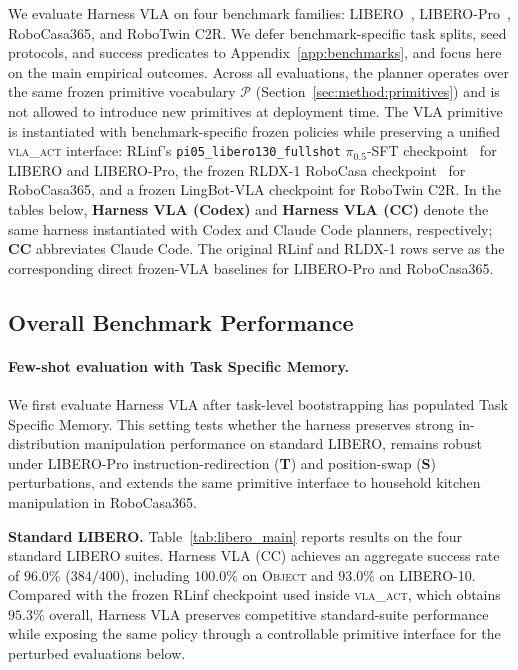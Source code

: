 \documentclass{article}
\begin{document}
We evaluate Harness VLA on four benchmark families: LIBERO~\citep{liu2023libero}, LIBERO-Pro~\citep{Lagrange1788}, RoboCasa365, and RoboTwin C2R. We defer benchmark-specific task splits, seed protocols, and success predicates to Appendix~\ref{app:benchmarks}, and focus here on the main empirical outcomes. Across all evaluations, the planner operates over the same frozen primitive vocabulary $\mathcal{P}$ (Section~\ref{sec:method:primitives}) and is not allowed to introduce new primitives at deployment time. The VLA primitive is instantiated with benchmark-specific frozen policies while preserving a unified \textsc{vla\_act} interface: RLinf's \texttt{pi05\_libero130\_fullshot} $\pi_{0.5}$-SFT checkpoint~\citep{yu2025rlinf} for LIBERO and LIBERO-Pro, the frozen RLDX-1 RoboCasa checkpoint~\citep{kim2026rldx} for RoboCasa365, and a frozen LingBot-VLA checkpoint for RoboTwin C2R. In the tables below, \textbf{Harness VLA (Codex)} and \textbf{Harness VLA (CC)} denote the same harness instantiated with Codex and Claude Code planners, respectively; \textbf{CC} abbreviates Claude Code. The original RLinf and RLDX-1 rows serve as the corresponding direct frozen-VLA baselines for LIBERO-Pro and RoboCasa365.

\subsection{Overall Benchmark Performance}
\label{sec:exp:overall}

\paragraph{Few-shot evaluation with Task Specific Memory.}
We first evaluate Harness VLA after task-level bootstrapping has populated Task Specific Memory. This setting tests whether the harness preserves strong in-distribution manipulation performance on standard LIBERO, remains robust under LIBERO-Pro instruction-redirection (\textbf{T}) and position-swap (\textbf{S}) perturbations, and extends the same primitive interface to household kitchen manipulation in RoboCasa365.

\textbf{Standard LIBERO.} Table~\ref{tab:libero_main} reports results on the four standard LIBERO suites. Harness VLA (CC) achieves an aggregate success rate of $\mathbf{96.0\%}$ ($384/400$), including $100.0\%$ on \textsc{Object} and $93.0\%$ on \textsc{LIBERO-10}. Compared with the frozen RLinf checkpoint used inside \textsc{vla\_act}, which obtains $95.3\%$ overall, Harness VLA preserves competitive standard-suite performance while exposing the same policy through a controllable primitive interface for the perturbed evaluations below.
\end{document}

